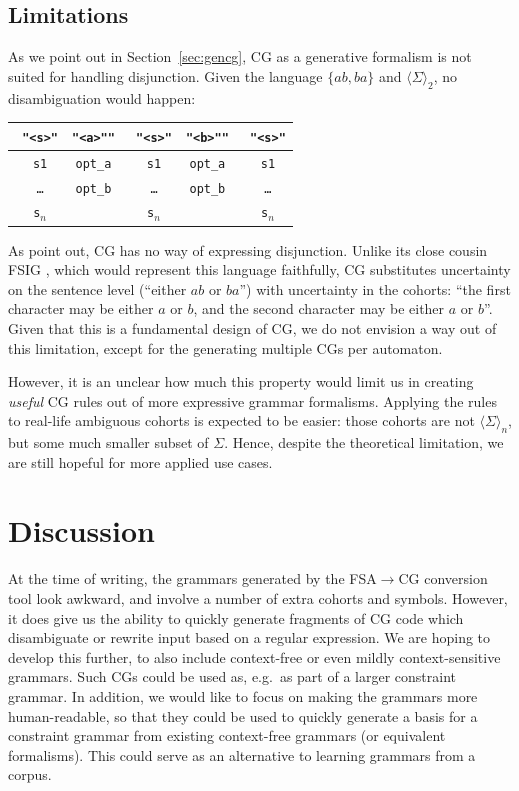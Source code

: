 \documentclass[11pt]{article}
\def\t#1{\texttt{#1}}
\def\h#1{{\tt \color{gray} #1}}
\def\swf{\h{"<s>"}}
\def\maxAmb#1{$\langle \Sigma \rangle_#1$}
\begin{document}
\subsection{Limitations}
As we point out in Section~\ref{sec:gencg}, CG as a generative formalism 
is not suited for handling disjunction.
Given the language $\{ab,ba\}$ and \maxAmb{2}, no disambiguation would happen:
%
\begin{table}[h]
  \centering\small
  \begin{tabular}{c|c|c|c|c}
    \swf        & \t{"<a>""}  & \swf      & \t{"<b>""}  & \swf    \\ \hline
     \h{s1}     & \t{opt\_a} & \h{s1}     & \t{opt\_a} & \h{s1} \\ 
     \h{\dots}  & \t{opt\_b} & \h{\dots}  & \t{opt\_b} & \h{\dots} \\
     \h{s$_n$}  &            & \h{s$_n$}  &            & \h{s$_n$}

  \end{tabular}
\end{table}
%
As  point out, CG has no way of expressing disjunction.
Unlike its close cousin FSIG \cite{koskenniemi90}, which would represent this
language faithfully, CG substitutes uncertainty on the sentence level (``either
$ab$ or $ba$'') with uncertainty in the cohorts: ``the first character may be
either $a$ or $b$, and the second character may be either $a$ or $b$''.
Given that this is a fundamental design of CG, we do not envision a way out of 
this limitation, except for the generating multiple CGs per automaton.

However, it is an unclear how much this property would limit us in creating 
\emph{useful} CG rules out of more expressive grammar formalisms.
Applying the rules to real-life ambiguous cohorts is expected to be easier:
those cohorts are not \maxAmb{n}, but some much smaller subset of $\Sigma$.
Hence, despite the theoretical limitation, we are still hopeful
for more applied use cases.


\section{Discussion}

At the time of writing, the grammars generated by the FSA$\rightarrow$CG
conversion tool look awkward, and involve a number of extra cohorts and symbols.
However, it does give us the ability to quickly generate fragments of CG code
which disambiguate or rewrite input based on a regular expression.
We are hoping to develop this further, to also include context-free or even
mildly context-sensitive grammars.
Such CGs could be used as, e.g.\ as part of a larger constraint grammar.
In addition, we would like to focus on making the grammars more human-readable,
so that they could be used to quickly generate a basis for a constraint grammar
from existing context-free grammars (or equivalent formalisms).
This could serve as an alternative to learning grammars from a corpus.
\end{document}
